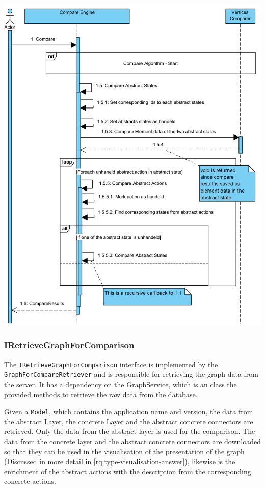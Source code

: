 \newpage

\begingroup
\captionsetup{type=figure}
\includegraphics[scale=0.9]{content/5-Results/Images/Compare-algorithm-compare.png}
\label{fig:compare-algorithm-compare}
\endgroup

\subsubsection{IRetrieveGraphForComparison}
The \verb|IRetrieveGraphForComparison| interface is implemented by the \verb|GraphForCompareRetriever| and is responsible for retrieving the graph data from the server. It has a dependency on the GraphService, which is an class the provided methods to retrieve the raw data from the database. 

Given a \verb|Model|, which contains the application name and version, the data from the abstract Layer, the concrete Layer and the abstract concrete connectors are retrieved. Only the data from the abstract layer is used for the comparison. The data from the concrete layer and the abstract concrete connectors are downloaded so that they can be used in the visualisation of the presentation of the graph (Discussed in more detail in \ref{rq:type-visualisation-answer}), likewise is the enrichment of the abstract actions with the description from the corresponding concrete actions.

